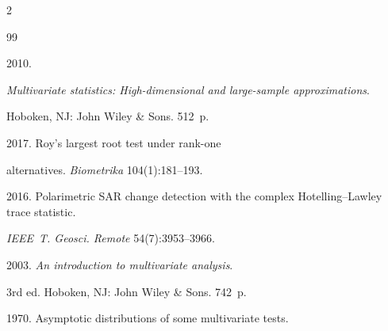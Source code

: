 







\vspace*{12pt}





  \begin{multicols}{2}





\renewcommand{\bibname}{\protect\rmfamily References}







{\small\frenchspacing


 {%




 \begin{thebibliography}{99}




 2010. 


\textit{Multivariate statistics: High-dimensional and large-sample approximations}.


 Hoboken, NJ: John Wiley \& Sons. 512~p.




 2017. Roy's largest root test under rank-one 


alternatives. \textit{Biometrika} 104(1):181--193.






 2016. Polarimetric SAR change detection with the complex Hotelling--Lawley trace statistic. 


 \textit{IEEE~T. Geosci. Remote} 54(7):3953--3966.




 2003. \textit{An introduction to multivariate analysis}. 


3rd ed. Hoboken, NJ: John Wiley \& Sons. 742~p.




 1970. Asymptotic distributions of some multivariate tests. 



\end{thebibliography}}}
\end{multicols}
